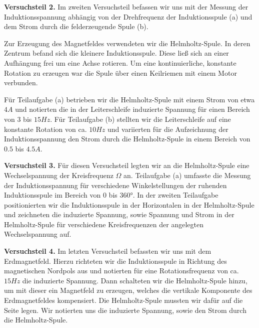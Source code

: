 \textbf{Versuchsteil 2.} Im zweiten Versuchsteil befassen wir uns mit der Messung der Induktionsspannung abhängig von der Drehfrequenz der Induktionsspule (a) und dem Strom durch die felderzeugende Spule (b). 

Zur Erzeugung des Magnetfeldes verwendeten wir die Helmholtz-Spule. In deren Zentrum befand sich die kleinere Induktionsspule. Diese ließ sich an einer Aufhängung frei um eine Achse rotieren. Um eine kontinuierliche, konstante Rotation zu erzeugen war die Spule über einen Keilriemen mit einem Motor verbunden.

Für Teilaufgabe (a) betrieben wir die Helmholtz-Spule mit einem Strom von etwa $4\si{A}$ und notierten die in der Leiterschleife induzierte Spannung für einen Bereich von $3$ bis $15\si{Hz}$. Für Teilaufgabe (b) stellten wir die Leiterschleife auf eine konstante Rotation von ca. $10\si{Hz}$ und variierten für die Aufzeichnung der Induktionsspannung den Strom durch die Helmholtz-Spule in einem Bereich von $0.5$ bis $4.5\si{A}$.

\textbf{Versuchsteil 3.} Für diesen Versuchsteil legten wir an die Helmholtz-Spule eine Wechselspannung der Kreisfrequenz $\Omega$ an. Teilaufgabe (a) umfasste die Messung der Induktionsspannung für verschiedene Winkelstellungen der ruhenden Induktionsspule im Bereich von $0$ bis $360$°. In der zweiten Teilaufgabe positionierten wir die Induktionsspule in der Horizontalen in der Helmholtz-Spule und zeichneten die induzierte Spannung, sowie Spannung und Strom in der Helmholtz-Spule für verschiedene Kreisfrequenzen der angelegten Wechselspannung auf.

\textbf{Versuchsteil 4.} Im letzten Versuchsteil befassten wir uns mit dem Erdmagnetfeld. Hierzu richteten wir die Induktionsspule in Richtung des magnetischen Nordpols aus und notierten für eine Rotationsfrequenz von ca. $15\si{Hz}$ die induzierte Spannung. Dann schalteten wir die Helmholtz-Spule hinzu, um mit dieser ein Magnetfeld zu erzeugen, welches die vertikale Komponente des Erdmagnetfeldes kompensiert. Die Helmholtz-Spule mussten wir dafür auf die Seite legen. Wir notierten uns die induzierte Spannung, sowie den Strom durch die Helmholtz-Spule.
